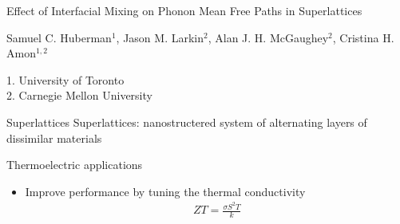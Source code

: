 \documentclass{beamer}
\begin{document}
\begin{frame}
\Large{Effect of Interfacial Mixing on Phonon Mean Free Paths in Superlattices}

\small{Samuel C. Huberman$^1$, Jason M. Larkin$^2$, Alan J. H. McGaughey$^2$, Cristina H. Amon$^{1,2}$}\\

\date{
	\\
	\vspace{1cm}
	\today
}
\vspace{1cm}
\tiny{1. University of Toronto}\\
\tiny{2. Carnegie Mellon University}
\end{frame}

\begin{frame}{Superlattices}
Superlattices: nanostructered system of alternating layers of dissimilar materials
\begin{figure}[t]
\begin{center}
\renewcommand{\figure}{Fig.}
\end{center}
\end{figure}

Thermoelectric applications
\begin{itemize}
\item Improve performance by tuning the thermal conductivity
\begin{equation}\label{EQ:NMD:qdot}
\begin{split}
ZT=\frac{\sigma S^2 T}{k}
\end{split}
\end{equation}
\end{itemize}
\end{frame}
\end{document}
